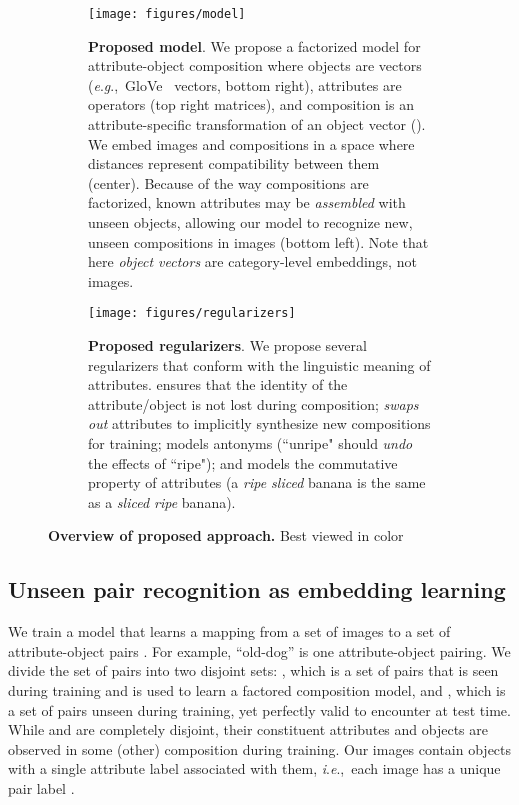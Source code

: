 \documentclass[runningheads]{llncs}
\newcommand{\ie}{\textit{i}.\textit{e}.,~}
\newcommand{\eg}{\textit{e}.\textit{g}.,~}
\begin{document}
\begin{figure}[t!]
\centering
\begin{subfigure}[b]{\textwidth}
   \texttt{[image: figures/model]}\vspace*{-0.1in}
   \caption{\textbf{Proposed model}. We propose a factorized model for attribute-object composition where objects are vectors (\eg GloVe~\cite{pennington2014glove} vectors, bottom right), attributes are operators (top right matrices), and composition is an attribute-specific transformation of an object vector (). We embed images  and compositions  in a space where distances represent compatibility between them (center). Because of the way compositions are factorized, known attributes may be \emph{assembled} with unseen objects, allowing our model to recognize new, unseen compositions in images (bottom left). Note that here \emph{object vectors} are category-level embeddings, not images.}
   \label{fig:model} \vspace*{0.15in}
\end{subfigure}
\begin{subfigure}[b]{\textwidth}
   \texttt{[image: figures/regularizers]}
   \caption{\textbf{Proposed regularizers}. We propose several regularizers that conform with the linguistic meaning of attributes.  ensures that the identity of the attribute/object is not lost during composition;  \emph{swaps out} attributes to implicitly synthesize new compositions for training;   models antonyms (``unripe" should \emph{undo} the effects of ``ripe"); and  models the commutative property of attributes (a \emph{ripe sliced} banana is the same as a \emph{sliced ripe} banana).}
   \label{fig:regularizers}
\end{subfigure}
\vspace{-0.2in}
\caption{\textbf{Overview of proposed approach.}  Best viewed in color}
\end{figure}

\subsection{Unseen pair recognition as embedding learning} \label{sec:manifold_recap}
\vspace*{-0.05in}
We train a model that learns a mapping from a set of images  to a set of attribute-object pairs .  For example, ``old-dog'' is one attribute-object pairing.  We divide the set of pairs into two disjoint sets: , which is a set of pairs that is seen during training and is used to learn a factored composition model, and , which is a set of pairs unseen during training, yet perfectly valid to encounter at test time.  While  and  are completely disjoint, their constituent attributes and objects are observed in some (other) composition during training. Our images contain objects with a single attribute label associated with them, \ie each image has a unique pair label .
\end{document}
